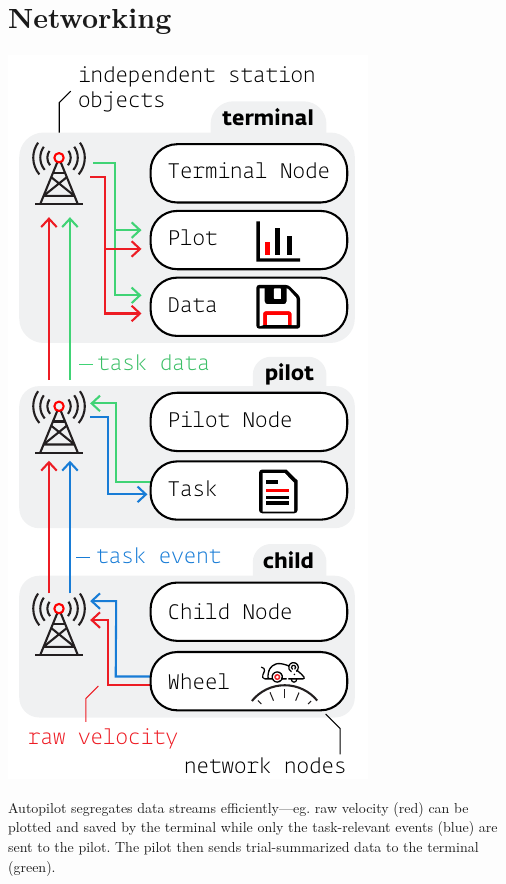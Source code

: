 \clearpage


\section{Networking}
\label{sec:networking}

\begin{marginfigure}[0.8cm]
\includegraphics[]{figures/side_24_networking.pdf}
\caption{Autopilot segregates data streams efficiently---eg. raw velocity (red) can be plotted and saved by the terminal while only the task-relevant events (blue) are sent to the pilot. The pilot then sends trial-summarized data to the terminal (green).}
\label{fig:datastreams}
\end{marginfigure}

